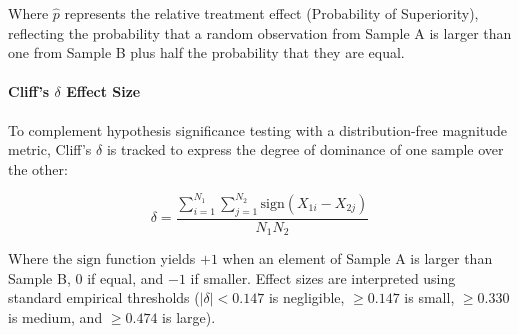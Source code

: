 Where $\hat{p}$ represents the relative treatment effect (Probability of Superiority), reflecting the probability that a random observation from Sample A is larger than one from Sample B plus half the probability that they are equal.

\paragraph{Cliff's $\delta$ Effect Size}
To complement hypothesis significance testing with a distribution-free magnitude metric, Cliff's $\delta$ is tracked to express the degree of dominance of one sample over the other:

\begin{equation}
    \delta = \frac{\sum_{i=1}^{N_1} \sum_{j=1}^{N_2} \mathrm{sign}(X_{1i} - X_{2j})}{N_1 N_2}
\end{equation}

Where the $\mathrm{sign}$ function yields $+1$ when an element of Sample A is larger than Sample B, $0$ if equal, and $-1$ if smaller. Effect sizes are interpreted using standard empirical thresholds ($|\delta| < 0.147$ is negligible, $\ge 0.147$ is small, $\ge 0.330$ is medium, and $\ge 0.474$ is large).

\newpage 
